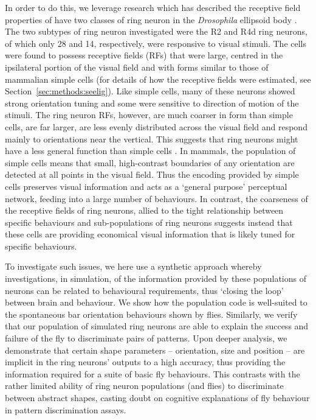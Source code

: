 \documentclass[10pt]{article}
\begin{document}
In order to do this, we leverage research which has described the receptive field properties of have two classes of ring neuron in the \emph{Drosophila} ellipsoid body \cite{Seelig2013}. The two subtypes of ring neuron investigated were the R2 and R4d ring neurons, of which only 28 and 14, respectively, were responsive to visual stimuli. The cells were found to possess receptive fields (RFs) that were large, centred in the ipsilateral portion of the visual field and with forms similar to those of mammalian simple cells \cite{Hubel1962} (for details of how the receptive fields were estimated, see Section~\ref{sec:methods:seelig}). Like simple cells, many of these neurons showed strong orientation tuning and some were sensitive to direction of motion of the stimuli. The ring neuron RFs, however, are much coarser in form than simple cells, are far larger, are less evenly distributed across the visual field and respond mainly to orientations near the vertical. This suggests that ring neurons might have a less general function than simple cells \cite{Wystrach2014}. In mammals, the population of simple cells means that small, high-contrast boundaries of any orientation are detected at all points in the visual field. Thus the encoding provided by simple cells preserves visual information and acts as a `general purpose' perceptual network, feeding into a large number of behaviours. In contrast, the coarseness of the receptive fields of ring neurons, allied to the tight relationship between specific behaviours and sub-populations of ring neurons suggests instead that these cells are providing economical visual information that is likely tuned for specific behaviours.

To investigate such issues, we here use a synthetic approach whereby investigations, in simulation, of the information provided by these populations of neurons can be related to behavioural requirements, thus `closing the loop' between brain and behaviour. We show how the population code is well-suited to the spontaneous bar orientation behaviours shown by flies. Similarly, we verify that our population of simulated ring neurons are able to explain the success and failure of the fly to discriminate pairs of patterns. Upon deeper analysis, we demonstrate that certain shape parameters -- orientation, size and position -- are implicit in the ring neurons' outputs to a high accuracy, thus providing the information required for a suite of basic fly behaviours. This contrasts with the rather limited ability of ring neuron populations (and flies) to discriminate between abstract shapes, casting doubt on cognitive explanations of fly behaviour in pattern discrimination assays.
\end{document}
